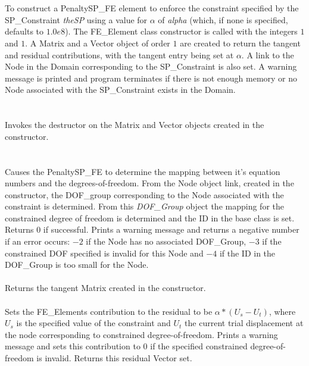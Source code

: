   \\
\\
To construct a PenaltySP\_FE element to enforce the constraint
specified by the SP\_Constraint {\em theSP} using a value for
$\alpha$ of {\em alpha} (which, if none is specified, defaults to
$1.0e8$). The FE\_Element class constructor is called with 
the integers $1$ and $1$. A Matrix and a Vector object of order $1$
are created to return the tangent and residual contributions, with the
tangent entry being set at $\alpha$. A link to the Node in the  Domain
corresponding to the SP\_Constraint is also set. A warning message is
printed and program terminates if there is not enough memory or no
Node associated with the SP\_Constraint exists in the Domain.\\

  \\
  \\
Invokes the destructor on the Matrix and Vector objects created in the
constructor. \\

  \\
 \\
Causes the PenaltySP\_FE to determine the mapping between it's equation
numbers and the degrees-of-freedom. From the Node object link, created
in the constructor, the DOF\_group corresponding to the Node
associated with the constraint is determined. From this {\em
DOF\_Group} object the mapping for the constrained degree of freedom
is determined and the ID in the base class is set. Returns $0$ if
successful. Prints a warning message and returns a negative number if
an error occurs: $-2$ if the
Node has no associated DOF\_Group, $-3$ if the constrained DOF
specified is invalid for this Node and $-4$ if the ID in the
DOF\_Group is too small for the Node. \\ 

 \\
Returns the tangent Matrix created in the constructor. \\

 \\
Sets the FE\_Elements contribution to the residual to be
$\alpha * (U_s - U_t)$, where $U_s$ is the specified value of the
constraint and $U_t$ the current trial displacement at the node
corresponding to constrained degree-of-freedom. Prints a warning
message and sets this contribution to $0$ if the specified constrained
degree-of-freedom is invalid. Returns this residual Vector set.


